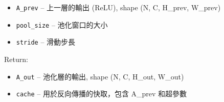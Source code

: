 \documentclass[11pt]{article}
\providecommand{\tightlist}{%
      \setlength{\itemsep}{0pt}\setlength{\parskip}{0pt}}
\begin{document}
\begin{itemize}
\tightlist
\item
  \texttt{A\_prev} -- 上一層的輸出 (ReLU), shape (N, C, H\_prev,
  W\_prev)
\item
  \texttt{pool\_size} -- 池化窗口的大小
\item
  \texttt{stride} -- 滑動步長
\end{itemize}

Return:

\begin{itemize}
\tightlist
\item
  \texttt{A\_out} -- 池化層的輸出, shape (N, C, H\_out, W\_out)
\item
  \texttt{cache} -- 用於反向傳播的快取，包含 A\_prev 和超參數
\end{itemize}
\end{document}
